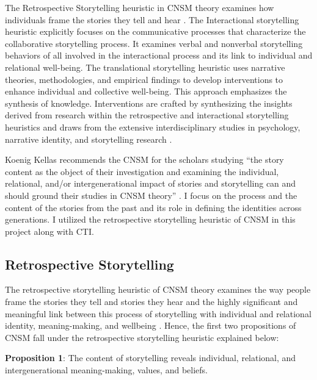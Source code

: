 The Retrospective Storytelling heuristic in CNSM theory examines how individuals frame the stories they tell and hear \citep[p.~120]{koenigkellasCommunicatedNarrativeSenseMaking2022}. The Interactional storytelling heuristic explicitly focuses on the communicative processes that characterize the collaborative storytelling process. It examines verbal and nonverbal storytelling behaviors of all involved in the interactional process and its link to individual and relational well-being. The translational storytelling heuristic uses narrative theories, methodologies, and empirical findings to develop interventions to enhance individual and collective well-being. This approach emphasizes the synthesis of knowledge. Interventions are crafted by synthesizing the insights derived from research within the retrospective and interactional storytelling heuristics and draws from the extensive interdisciplinary studies in psychology, narrative identity, and storytelling research \citep{koenigkellasCommunicatedNarrativeSenseMaking2022}.

Koenig Kellas recommends the CNSM for the scholars studying ``the story content as the object of their investigation and examining the individual, relational, and/or intergenerational impact of stories and storytelling can and should ground their studies in CNSM theory'' \citep[p.~119]{koenigkellasCommunicatedNarrativeSenseMaking2022}. I focus on the process and the content of the stories from the past and its role in defining the identities across generations. I utilized the retrospective storytelling heuristic of CNSM in this project along with CTI.

\subsection{Retrospective Storytelling}

The retrospective storytelling heuristic of CNSM theory examines the way people frame the stories they tell and stories they hear and the highly significant and meaningful link between this process of storytelling with individual and relational identity, meaning-making, and wellbeing \citep[p.~120]{koenigkellasCommunicatedNarrativeSenseMaking2022}. Hence, the first two propositions of CNSM fall under the retrospective storytelling heuristic explained below:


\textbf{Proposition 1}: The content of storytelling reveals individual, relational, and intergenerational meaning-making, values, and beliefs. 

